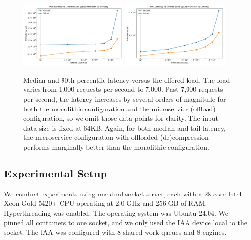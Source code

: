 \begin{figure}[!ht]            %
  \centering
  \includegraphics[width=0.48\textwidth]{p50.pdf}%
  \hfill
  \includegraphics[width=0.48\textwidth]{p90.pdf}
  \caption{Median and 90th percentile latency versus the offered load. The load varies from 1,000 requests per second to 7,000. Past 7,000 requests per second, the latency increases by several orders of magnitude for both the monolithic configuration and the microservice (offload) configuration, so we omit those data points for clarity. The input data size is fixed at 64KB. Again, for both median and tail latency, the microservice configuration with offloaded (de)compression performs marginally better than the monolithic configuration.}
  \label{fig:tput}
\end{figure}

\subsection{Experimental Setup}
We conduct experiments using one dual-socket server, each with a 28-core Intel Xeon Gold 5420+ CPU operating at 2.0 GHz and 256 GB of RAM. 
Hyperthreading was enabled. 
The operating system was Ubuntu 24.04. 
We pinned all containers to one socket, and we only used the IAA device local to the socket. 
The IAA was configured with 8 shared work queues and 8 engines.

